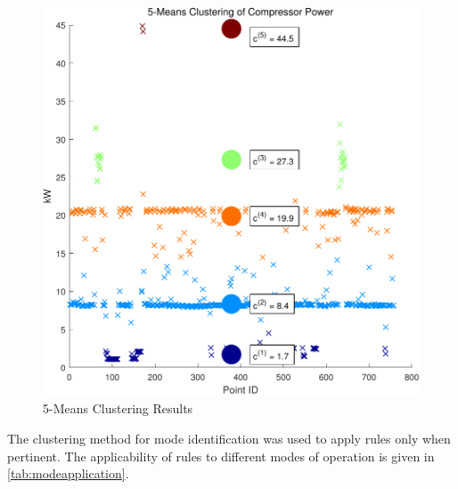 \begin{figure}
\includegraphics[width = \columnwidth]{./Images/5MeansClustering.pdf}
\caption{5-Means Clustering Results}
\label{fig:5meansclustering}
\end{figure}

The clustering method for mode identification was used to apply rules only when pertinent. The applicability of rules to different modes of operation is given in \autoref{tab:modeapplication}.


